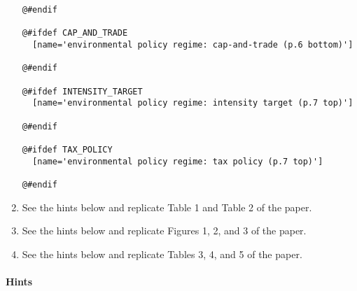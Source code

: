 \begin{enumerate}
{\begin{lstlisting}[style=Matlab-editor,basicstyle=\mlttfamily\scriptsize]
@#endif

@#ifdef CAP_AND_TRADE
  [name='environmental policy regime: cap-and-trade (p.6 bottom)']
  
@#endif

@#ifdef INTENSITY_TARGET
  [name='environmental policy regime: intensity target (p.7 top)']
  
@#endif

@#ifdef TAX_POLICY
  [name='environmental policy regime: tax policy (p.7 top)']
  
@#endif
\end{lstlisting}
}
\item See the hints below and replicate Table 1 and Table 2 of the paper.

\item See the hints below and replicate Figures 1, 2, and 3 of the paper.

\item See the hints below and replicate Tables 3, 4, and 5 of the paper.

\end{enumerate}

\newpage
\paragraph{Hints}


